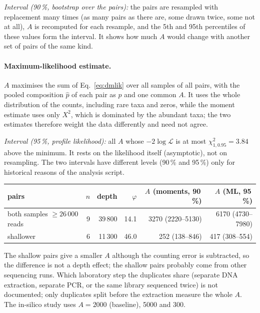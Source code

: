 \documentclass[11pt,a4paper]{article}
\begin{document}
\emph{Interval (90\,\%, bootstrap over the pairs):} the pairs are resampled with replacement many times (as many pairs as there are, some drawn twice, some not at all), $A$ is recomputed for each resample, and the 5th and 95th percentiles of these values form the interval. It shows how much $A$ would change with another set of pairs of the same kind.

\paragraph{Maximum-likelihood estimate.} $A$ maximises the sum of Eq.~\eqref{eq:dmlik} over all samples of all pairs, with the pooled composition $\hat p$ of each pair as $p$ and one common $A$. It uses the whole distribution of the counts, including rare taxa and zeros, while the moment estimate uses only $X^2$, which is dominated by the abundant taxa; the two estimates therefore weight the data differently and need not agree.

\emph{Interval (95\,\%, profile likelihood):} all $A$ whose $-2\log\mathcal{L}$ is at most $\chi^2_{1,0.95} = 3.84$ above the minimum. It rests on the likelihood itself (asymptotic), not on resampling. The two intervals have different levels (90\,\% and 95\,\%) only for historical reasons of the analysis script.

\begin{center}
\small
\begin{tabular}{@{}lrrrrr@{}}
\toprule
pairs & $n$ & depth\footnotemark & $\varphi$ & $A$ (moments, 90\,\%) & $A$ (ML, 95\,\%) \\
\midrule
both samples $\ge 26\,000$ reads & 9 & 39\,800 & 14.1 & 3270 (2220--5130) & 6170 (4730--7980) \\
shallower & 6 & 11\,300 & 46.0 & 252 (138--846) & 417 (308--554) \\
\bottomrule
\end{tabular}
\end{center}

\noindent
The shallow pairs give a smaller $A$ although the counting error is subtracted, so the difference is not a depth effect; the shallow pairs probably come from other sequencing runs. Which laboratory step the duplicates share (separate DNA extraction, separate PCR, or the same library sequenced twice) is not documented; only duplicates split before the extraction measure the whole $A$. The in-silico study uses $A = 2000$ (baseline), 5000 and 300.
\end{document}

